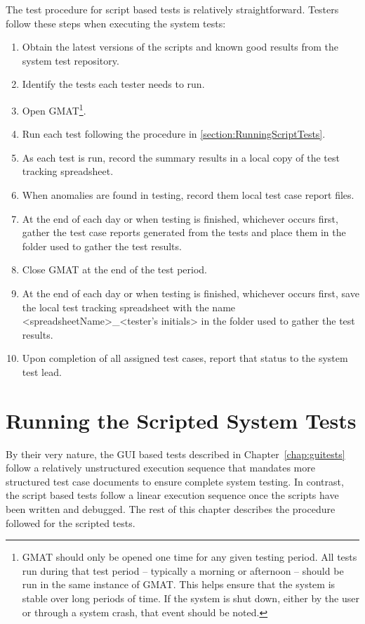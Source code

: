 The test procedure for script based tests is relatively straightforward.  Testers follow these steps when executing the system tests:

\begin{enumerate}
\item Obtain the latest versions of the scripts and known good results from the system test repository.
\item Identify the tests each tester needs to run.
\item Open GMAT\footnote{GMAT should only be opened one time for any given testing period.  All tests run during that test period -- typically a morning or afternoon -- should be run in the same instance of GMAT.  This helps ensure that the system is stable over long periods of time.  If the system is shut down, either by the user or through a system crash, that event should be noted.}.
\item Run each test following the procedure in \ref{section:RunningScriptTests}.
\item As each test is run, record the summary results in a local copy of the test tracking
spreadsheet.
\item When anomalies are found in testing, record them local test case report files.
\item At the end of each day or when testing is finished, whichever occurs first, gather the test
case reports generated from the tests and place them in the folder used to gather the test results.
\item Close GMAT at the end of the test period.
\item At the end of each day or when testing is finished, whichever occurs first, save the local
test tracking spreadsheet with the name <spreadsheetName>\_<tester's initials> in the folder
used to gather the test results.
\item Upon completion of all assigned test cases, report that status to the system test lead.
\end{enumerate}

\section{\label{section:RunningScriptTests}Running the Scripted System Tests}

By their very nature, the GUI based tests described in Chapter~\ref{chap:guitests} follow a relatively unstructured execution sequence that mandates more structured test case documents to ensure complete system testing.  In contrast, the script based tests follow a linear execution sequence once the scripts have been written and debugged.  The rest of this chapter describes the procedure followed for the scripted tests.

